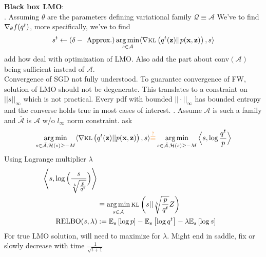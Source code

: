 {\bf Black box LMO}: \\
. Assuming 
$\theta$ are the parameters defining variational family $\mathcal{Q} \equiv \mathcal{A}$
We've to find $\nabla_{\theta}f(q^t)$, more specifically, we've to find 
$$
s^t \gets (\delta-\text{ Approx.}) \operatorname*{arg\,min}\limits_{s \in \mathcal{A}}\langle 
  \nabla \textsc{kl}\left(q^t(\mathbf{z}) || p(\mathbf{x}, \mathbf{z})\right), s \rangle
$$
\TODO add how \cite{guo2016boosting} \cite{locatello2017boosting} deal with optimization of LMO. Also
add the part about $\text{conv}(\mathcal{A})$ being sufficient instead of $\mathcal{A}$.\\
Convergence of SGD not fully understood. To guarantee convergence of FW, solution of LMO should 
not be degenerate. This translates to a constraint on $||s||_{\infty}$ which is not practical.
Every pdf with bounded $||\cdot||_{\infty}$ has bounded entropy and the converse holds true in 
most cases of interest. . Assume $\mathcal{A}$ is such a family
and $\bar{\mathcal{A}}$ is $\mathcal{A}$ w/o $l_{\infty}$ norm constraint.  \TODO ask
$$
\argmin\limits_{s \in \bar{\mathcal{A}}, \mathcal{H}(s) \geq -M}\langle \grad 
\kl{q^t(\bz) || p(\bx, \bz)},
s \rangle \orange{\overset{?}{\equiv}}
  \argmin\limits_{s \in \bar{\mathcal{A}}, \mathcal{H}(s) \geq -M}\Big\langle s, 
  \log \frac{q^t}{p} \Big\rangle
$$
Using Lagrange multiplier $\lambda$
\begin{align}
  \Bigg\langle s, \log \Big(\frac{s}{\sqrt[\lambda]{\frac{p}{q^t}}} \Big)\Bigg\rangle \nonumber\\
    &\equiv \operatorname*{arg\,min}\limits_{s \in \bar{\mathcal{A}}}\textsc{kl}\left(s||{\sqrt[\lambda]{\frac{p}{q^t}}} Z\right) \nonumber\\
  \text{RELBO}(s, \lambda) &:= \mathbb{E}_{s}\left[\log p\right] - \mathbb{E}_{s}\left[\log q^t\right] - \lambda\mathbb{E}_{s}\left[\log s\right]
\end{align}
For true LMO solution, will need to maximize for $\lambda$. Might end in saddle, fix or slowly decrease
with time $\frac{1}{\sqrt{t + 1}}$

